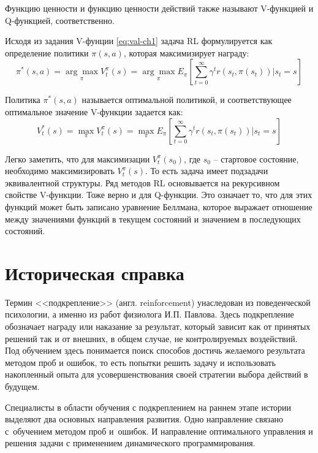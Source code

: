 Функцию ценности и функцию ценности действий также называют V-функцией и Q-функцией, соответственно.

Исходя из задания V-фунции \eqref{eq:val-ch1} задача RL формулируется как определение политики $\pi(s,a)$, которая максимизирует награду: 
\begin{equation*}
\pi^{*}(s,a) = \underset{\pi}{\arg \max}  V_t^{\pi}(s) = \underset{\pi}{\arg \max }  E_{\pi} \left[\sum_{t=0}^{\infty}\gamma^{t}r(s_t, \pi(s_t))\Bigg|s_t = s \right]
\end{equation*}

Политика $\pi^{*}(s,a)$ называется оптимальной политикой, и соответствующее оптимальное значение V-функции задается как:
\begin{equation*}
V_t^{*}(s) = \underset{\pi}{\max }  V_t^{\pi}(s) = \underset{\pi}{\max }  E_{\pi} \left[\sum_{t=0}^{\infty}\gamma^{t}r(s_t, \pi(s_t))\Bigg|s_t = s \right]
\end{equation*}

Легко заметить, что для максимизации $V_t^{\pi}(s_0)$, где $s_0$ -- стартовое состояние, необходимо максимизировать $V_t^{\pi}(s)$. То есть задача имеет подзадачи эквивалентной структуры. Ряд методов RL основывается на рекурсивном свойстве V-функции. Тоже верно и для Q-функции. Это означает то, что для этих функций может быть записано уравнение Беллмана, которое выражает отношение между значениями функций в текущем состояний и значением в последующих состояний.
%
\section{Историческая справка}

Термин <<подкрепление>> (англ. reinforcement) унаследован из поведенческой психологии, а именно из работ физиолога И.П. Павлова. Здесь подкрепление обозначает награду или наказание за  результат, который зависит как от принятых решений так и от внешних, в общем случае, не контролируемых воздействий. Под обучением здесь понимается поиск способов достичь желаемого результата методом проб и ошибок, то есть попытки решить задачу и использовать накопленный опыта для усовершенствования своей стратегии выбора действий в будущем.

Специалисты в области обучения с подкреплением на раннем этапе истории выделяют два основных  направления развития. Одно направление связано с обучением методом проб и ошибок. И направление оптимального управления и решения задачи с применением динамического программирования.

